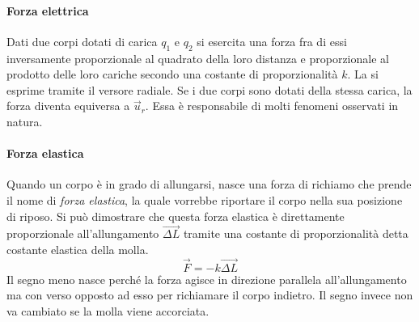 \documentclass[10pt,a4paper]{book}
\begin{document}
\paragraph{Forza elettrica} Dati due corpi dotati di carica $q_1$ e $q_2$ si esercita una forza fra di essi inversamente proporzionale al quadrato della loro distanza e proporzionale al prodotto delle loro cariche secondo una costante di proporzionalità $k$. La si esprime tramite il versore radiale. Se i due corpi sono dotati della stessa carica, la forza diventa equiversa a $\vec{u}_r$. Essa è responsabile di molti fenomeni osservati in natura.

\paragraph{Forza elastica} Quando un corpo è in grado di allungarsi, nasce una forza di richiamo che prende il nome di \emph{forza elastica}, la quale vorrebbe riportare il corpo nella sua posizione di riposo. Si può dimostrare che questa forza elastica è direttamente proporzionale all'allungamento $\vec{\Delta L}$ tramite una costante di proporzionalità detta costante elastica della molla.
\[
	\vec{F}=-k\vec{\Delta L}
\]
Il segno meno nasce perché la forza agisce in direzione parallela all'allungamento ma con verso opposto ad esso per richiamare il corpo indietro. Il segno invece non va cambiato se la molla viene accorciata.
\end{document}
